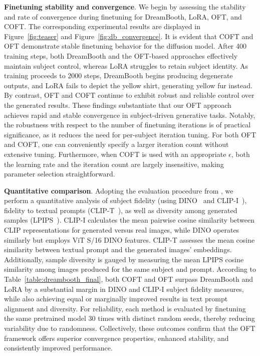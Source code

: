 \textbf{Finetuning stability and convergence}. We begin by assessing the stability and rate of convergence during finetuning for DreamBooth, LoRA, OFT, and COFT. The corresponding experimental results are displayed in Figure~\ref{fig:teaser} and Figure~\ref{fig:db_convergence}. It is evident that COFT and OFT demonstrate stable finetuning behavior for the diffusion model. After 400 training steps, both DreamBooth and the OFT-based approaches effectively maintain subject control, whereas LoRA struggles to retain subject identity. As training proceeds to 2000 steps, DreamBooth begins producing degenerate outputs, and LoRA fails to depict the yellow shirt, generating yellow fur instead. By contrast, OFT and COFT continue to exhibit robust and reliable control over the generated results. These findings substantiate that our OFT approach achieves rapid and stable convergence in subject-driven generative tasks. Notably, the robustness with respect to the number of finetuning iterations is of practical significance, as it reduces the need for per-subject iteration tuning. For both OFT and COFT, one can conveniently specify a larger iteration count without extensive tuning. Furthermore, when COFT is used with an appropriate $\epsilon$, both the learning rate and the iteration count are largely insensitive, making parameter selection straightforward.

\textbf{Quantitative comparison}. Adopting the evaluation procedure from \cite{ruiz2023dreambooth}, we perform a quantitative analysis of subject fidelity (using DINO~\cite{caron2021emerging} and CLIP-I~\cite{radford2021learning}), fidelity to textual prompts (CLIP-T~\cite{radford2021learning}), as well as diversity among generated samples (LPIPS~\cite{zhang2018unreasonable}). CLIP-I calculates the mean pairwise cosine similarity between CLIP representations for generated versus real images, while DINO operates similarly but employs ViT S/16 DINO features. CLIP-T assesses the mean cosine similarity between textual prompt and the generated images' embeddings. Additionally, sample diversity is gauged by measuring the mean LPIPS cosine similarity among images produced for the same subject and prompt. According to Table~\ref{table:dreambooth_final}, both COFT and OFT surpass DreamBooth and LoRA by a substantial margin in DINO and CLIP-I subject fidelity measures, while also achieving equal or marginally improved results in text prompt alignment and diversity. For reliability, each method is evaluated by finetuning the same pretrained model 30 times with distinct random seeds, thereby reducing variability due to randomness. Collectively, these outcomes confirm that the OFT framework offers superior convergence properties, enhanced stability, and consistently improved performance.


